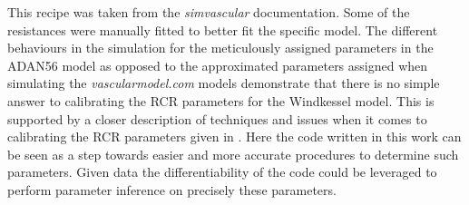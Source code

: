 \documentclass[a4paper, oneside]{discothesis}
\begin{document}
This recipe was taken from the \emph{simvascular} documentation. \cite{simvascular}
Some of the resistances were manually fitted to better fit the specific model.
The different behaviours in the simulation for the meticulously assigned parameters in the ADAN56 model as opposed to the approximated parameters assigned when simulating the \emph{vascularmodel.com} models demonstrate that there is no simple answer to calibrating the RCR parameters for the Windkessel model.
This is supported by a closer description of techniques and issues when it comes to calibrating the RCR parameters given in \cite{köppl2023dimension}.
Here the code written in this work can be seen as a step towards easier and more accurate procedures to determine such parameters.
Given data the differentiability of the code could be leveraged to perform parameter inference on precisely these parameters.
\end{document}

